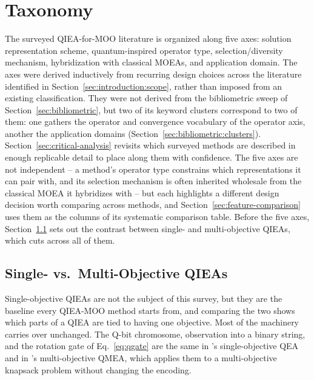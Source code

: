 \section{Taxonomy}
\label{sec:taxonomy}

The surveyed QIEA-for-MOO literature is organized along five axes:
solution representation scheme, quantum-inspired operator type,
selection/diversity mechanism, hybridization with classical MOEAs, and
application domain. The axes were derived inductively from recurring
design choices across the literature identified in
Section~\ref{sec:introduction:scope}, rather than imposed from an
existing classification. They were not derived from the bibliometric
sweep of Section~\ref{sec:bibliometric}, but two of its keyword
clusters correspond to two of them: one gathers the operator and
convergence vocabulary of the operator axis, another the application
domains (Section~\ref{sec:bibliometric:clusters}).
Section~\ref{sec:critical-analysis} revisits which surveyed methods are
described in enough replicable detail to place along them with
confidence. The five axes are not independent -- a method's operator
type constrains which representations it can pair with, and its
selection mechanism is often inherited wholesale from the classical MOEA
it hybridizes with -- but each highlights a different design decision
worth comparing across methods, and Section~\ref{sec:feature-comparison}
uses them as the columns of its systematic comparison table. Before the
five axes, Section~\ref{sec:taxonomy:objectives} sets out the contrast
between single- and multi-objective QIEAs, which cuts across all of
them.

\subsection{Single- vs.\ Multi-Objective QIEAs}
\label{sec:taxonomy:objectives}

Single-objective QIEAs are not the subject of this survey, but they are
the baseline every QIEA-MOO method starts from, and comparing the two
shows which parts of a QIEA are tied to having one objective. Most of
the machinery carries over unchanged. The Q-bit chromosome, observation
into a binary string, and the rotation gate of Eq.~\ref{eq:qgate} are
the same in \citet{han2002qea}'s single-objective QEA and in
\citet{kim2006qmea}'s multi-objective QMEA, which applies them to a
multi-objective knapsack problem without changing the encoding.

